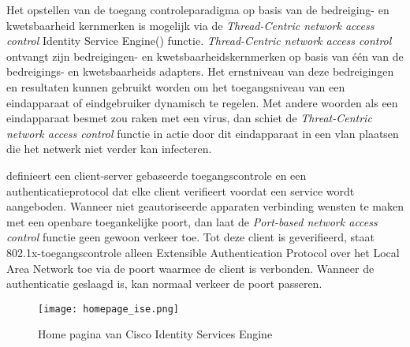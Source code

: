 \newline
Het opstellen van de toegang controleparadigma op basis van de bedreiging- en kwetsbaarheid kernmerken is mogelijk via de \textit{Thread-Centric network access control} Identity Service Engine(\cite{TCNAC}) functie. \textit{Thread-Centric network access control} ontvangt zijn bedreigingen- en kwetsbaarheidskernmerken op basis van één van de bedreigings- en kwetsbaarheids adapters. Het ernstniveau van deze bedreigingen en resultaten kunnen gebruikt worden om het toegangsniveau van een eindapparaat of eindgebruiker dynamisch te regelen.
\newline
\newline
Met andere woorden als een eindapparaat besmet zou raken met een virus, dan schiet de \textit{Threat-Centric network access control} functie in actie door dit eindapparaat in een vlan plaatsen die het netwerk niet verder kan infecteren. 

\newline
\cite{PBAC} definieert een client-server gebaseerde toegangscontrole en een authenticatieprotocol dat elke client verifieert voordat een service wordt aangeboden. Wanneer niet geautoriseerde apparaten verbinding wensten te maken met een openbare toegankelijke poort, dan laat de \textit{Port-based network access control}  functie geen gewoon verkeer toe.
\newline
\newline
Tot deze client is geverifieerd, staat 802.1x-toegangscontrole alleen Extensible Authentication Protocol over het Local Area Network toe via de poort waarmee de client is verbonden. Wanneer de authenticatie geslaagd is, kan normaal verkeer de poort passeren.

\begin{figure}[H]
	\centering
	\texttt{[image: homepage\_ise.png]}
	\caption{Home pagina van Cisco Identity Services Engine}
	\label{fig:homeISE}
\end{figure}

